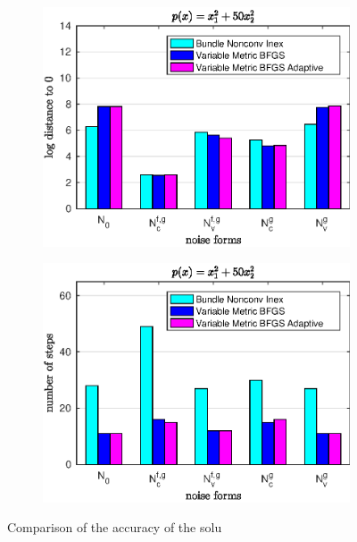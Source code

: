 \begin{figure}[ht]
	\begin{subfigure}[t]{0.49\textwidth}
		\includegraphics[width=\textwidth]{Pictures/Plots/accuracy_bar_parab.eps}
	\end{subfigure}
	\begin{subfigure}[t]{0.49\textwidth}
		\begin{center}
			\includegraphics[width=\textwidth]{Pictures/Plots/steps_bar_parab.eps}
		\end{center}
	\end{subfigure}
	\caption{Comparison of the accuracy of the solu}
	\label{fig_bar_parab}
\end{figure}

